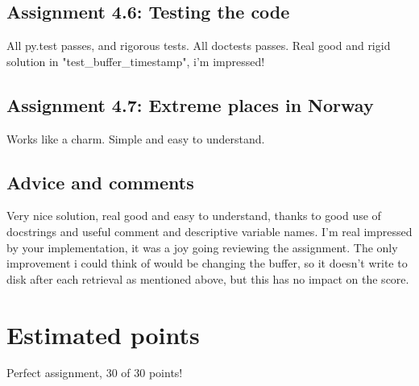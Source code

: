 \documentclass[a4paper]{article}
\begin{document}
\subsection*{Assignment 4.6: Testing the code}
All py.test passes, and rigorous tests. All doctests passes.
Real good and rigid solution in "test\_buffer\_timestamp", i'm impressed!


\subsection*{Assignment 4.7: Extreme places in Norway}
Works like a charm. Simple and easy to understand.


\subsection{Advice and comments}
Very nice solution, real good and easy to understand, thanks to good use of docstrings and useful comment and descriptive variable names. I'm real impressed by your implementation, it was a joy going reviewing the assignment. \newline
The only improvement i could think of would be changing the buffer, so it doesn't write to disk after each retrieval as mentioned above, but this has no impact on the score. 
\section{Estimated points}\label{sec:points}
Perfect assignment, 30 of 30 points!




\end{document}
